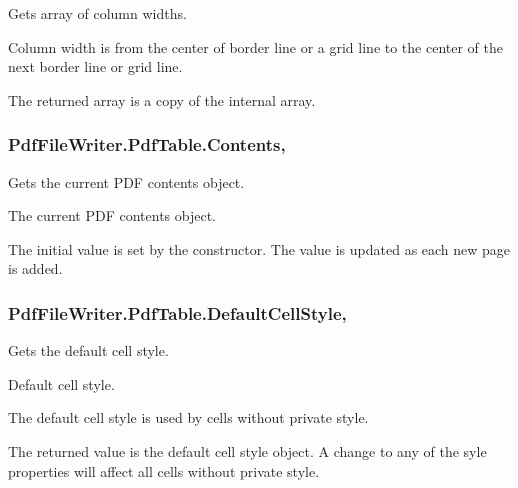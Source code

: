 Gets array of column widths. 

Column width is from the center of border line or a grid line to the center of the next border line or grid line. 

The returned array is a copy of the internal array. 
\subsubsection[{\texorpdfstring{Contents}{Contents}}]{ Pdf\+File\+Writer.\+Pdf\+Table.\+Contents\hspace{0.3cm}{\ttfamily [get]}, {\ttfamily [set]}}\hypertarget{class_pdf_file_writer_1_1_pdf_table_ae2afb49f8b53a3d28cc2ddbe086574d5}{}\label{class_pdf_file_writer_1_1_pdf_table_ae2afb49f8b53a3d28cc2ddbe086574d5}


Gets the current P\+DF contents object. 

The current P\+DF contents object.

The initial value is set by the constructor. The value is updated as each new page is added. 
\subsubsection[{\texorpdfstring{Default\+Cell\+Style}{DefaultCellStyle}}]{ Pdf\+File\+Writer.\+Pdf\+Table.\+Default\+Cell\+Style\hspace{0.3cm}{\ttfamily [get]}, {\ttfamily [set]}}\hypertarget{class_pdf_file_writer_1_1_pdf_table_a79b592d8a634fbb2d47c7ceb9b63f77f}{}\label{class_pdf_file_writer_1_1_pdf_table_a79b592d8a634fbb2d47c7ceb9b63f77f}


Gets the default cell style. 

Default cell style.

The default cell style is used by cells without private style. 

The returned value is the default cell style object. A change to any of the syle properties will affect all cells without private style. 
